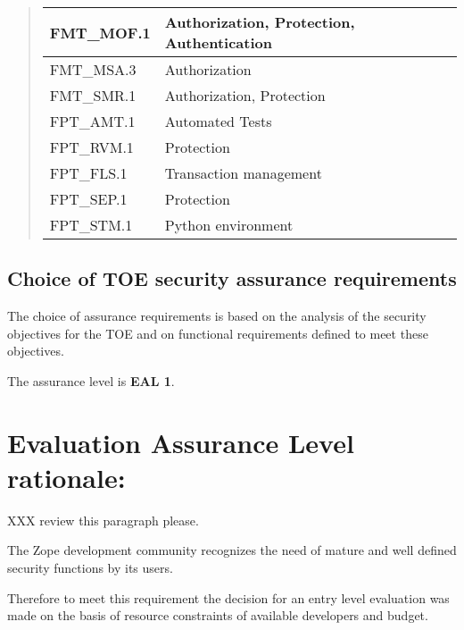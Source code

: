 \documentclass[12pt,english]{scrbook}
\begin{document}
\begin{quote}
\begin{longtable}[c]{|l|l|}
FMT{\_}MOF.1
 & 
Authorization, Protection, Authentication
 \\
\hline

FMT{\_}MSA.3
 & 
Authorization
 \\
\hline

FMT{\_}SMR.1
 & 
Authorization, Protection
 \\
\hline

FPT{\_}AMT.1
 & 
Automated Tests
 \\
\hline

FPT{\_}RVM.1
 & 
Protection
 \\
\hline

FPT{\_}FLS.1
 & 
Transaction management
 \\
\hline

FPT{\_}SEP.1
 & 
Protection
 \\
\hline

FPT{\_}STM.1
 & 
Python environment
 \\
\hline
\end{longtable}
\end{quote}




\subsection{Choice of TOE security assurance requirements}

The choice of assurance requirements is based on the analysis of the security
objectives for the TOE and on functional requirements defined to meet these
objectives.

The assurance level is \textbf{EAL 1}.




\section{Evaluation Assurance Level rationale:}

XXX review this paragraph please.

The Zope development community recognizes the need of mature and well defined
security functions by its users.

Therefore to meet this requirement the decision for an entry level evaluation
was made on the basis of resource constraints of available developers and
budget.
\end{document}
